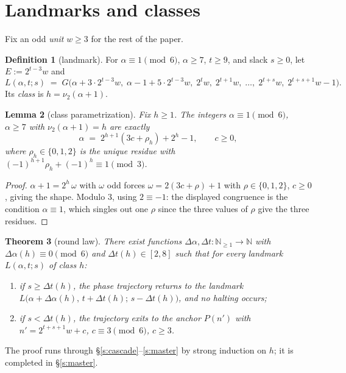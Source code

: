 \documentclass[11pt]{amsart}
\newtheorem{theorem}{Theorem}[section]
\newtheorem{lemma}[theorem]{Lemma}
\theoremstyle{definition}
\newtheorem{definition}[theorem]{Definition}
\newcommand{\nn}{\mathbb{N}}
\newcommand{\vtwo}[1]{\nu_2(#1)}
\begin{document}
\section{Landmarks and classes}\label{s:landmark}

Fix an odd \emph{unit} $w\ge3$ for the rest of the paper.

\begin{definition}[landmark]\label{def:landmark}
For $\alpha\equiv1\pmod6$, $\alpha\ge7$, $t\ge9$, and slack $s\ge0$, let
$E:=2^{t-3}w$ and
\[
L(\alpha,t;s)\;=\;G\bigl(\alpha+3\cdot2^{t-3}w,\;\alpha-1+5\cdot2^{t-3}w,\;
2^{t}w,\;2^{t+1}w,\;\dots,\;2^{t+s}w,\;2^{t+s+1}w-1\bigr).
\]
Its \emph{class} is $h=\vtwo{\alpha+1}$.
\end{definition}

\begin{lemma}[class parametrization]\label{lem:class}
Fix $h\ge1$. The integers $\alpha\equiv1\pmod6$, $\alpha\ge7$ with
$\vtwo{\alpha+1}=h$ are exactly
\[
\alpha \;=\; 2^{h+1}(3c+\rho_h)+2^{h}-1,\qquad c\ge0,
\]
where $\rho_h\in\{0,1,2\}$ is the unique residue with
$(-1)^{h+1}\rho_h+(-1)^{h}\equiv1\pmod3$.
\end{lemma}

\begin{proof}
$\alpha+1=2^{h}\,\omega$ with $\omega$ odd forces
$\omega=2(3c+\rho)+1$ with $\rho\in\{0,1,2\}$, $c\ge0$, giving the shape.
Modulo $3$, using $2\equiv-1$: the displayed congruence is the condition
$\alpha\equiv1$, which singles out one $\rho$ since the three values of
$\rho$ give the three residues.
\end{proof}

\begin{theorem}[round law]\label{thm:round}
There exist functions $\Delta\alpha,\Delta t:\nn_{\ge1}\to\nn$ with
$\Delta\alpha(h)\equiv0\pmod6$ and $\Delta t(h)\in[2,8]$ such that for every
landmark $L(\alpha,t;s)$ of class $h$:
\begin{enumerate}
\item if $s\ge\Delta t(h)$, the phase trajectory returns to the landmark
$L\bigl(\alpha+\Delta\alpha(h),\,t+\Delta t(h);\,s-\Delta t(h)\bigr)$, and
no halting occurs;
\item if $s<\Delta t(h)$, the trajectory exits to the anchor
$P(n')$ with $n'=2^{t+s+1}w+c$, $c\equiv3\pmod6$, $c\ge3$.
\end{enumerate}
\end{theorem}

The proof runs through \S\ref{s:cascade}--\ref{s:master} by strong
induction on $h$; it is completed in \S\ref{s:master}.
\end{document}
